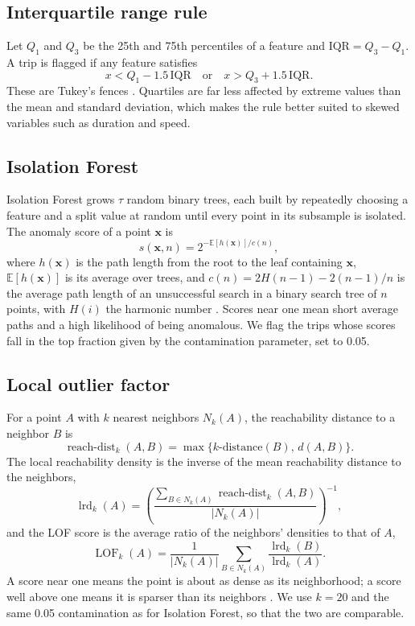 \documentclass{ieeeaccess}
\begin{document}
\subsection{Interquartile range rule}
Let $Q_1$ and $Q_3$ be the 25th and 75th percentiles of a feature and $\mathrm{IQR}=Q_3-Q_1$. A trip is flagged if any feature satisfies
\begin{equation}
x<Q_1-1.5\,\mathrm{IQR}\quad\text{or}\quad x>Q_3+1.5\,\mathrm{IQR}.
\end{equation}
These are Tukey's fences \cite{tukey1977}. Quartiles are far less affected by extreme values than the mean and standard deviation, which makes the rule better suited to skewed variables such as duration and speed.

\subsection{Isolation Forest}
Isolation Forest grows $\tau$ random binary trees, each built by repeatedly choosing a feature and a split value at random until every point in its subsample is isolated. The anomaly score of a point $\mathbf{x}$ is
\begin{equation}
s(\mathbf{x},n)=2^{-\mathbb{E}[h(\mathbf{x})]/c(n)},
\end{equation}
where $h(\mathbf{x})$ is the path length from the root to the leaf containing $\mathbf{x}$, $\mathbb{E}[h(\mathbf{x})]$ is its average over trees, and $c(n)=2H(n-1)-2(n-1)/n$ is the average path length of an unsuccessful search in a binary search tree of $n$ points, with $H(i)$ the harmonic number \cite{liu2008}. Scores near one mean short average paths and a high likelihood of being anomalous. We flag the trips whose scores fall in the top fraction given by the contamination parameter, set to 0.05.

\subsection{Local outlier factor}
For a point $A$ with $k$ nearest neighbors $N_k(A)$, the reachability distance to a neighbor $B$ is
\begin{equation}
\operatorname{reach\text{-}dist}_k(A,B)=\max\{k\text{-distance}(B),\,d(A,B)\}.
\end{equation}
The local reachability density is the inverse of the mean reachability distance to the neighbors,
\begin{equation}
\operatorname{lrd}_k(A)=\left(\frac{\sum_{B\in N_k(A)}\operatorname{reach\text{-}dist}_k(A,B)}{|N_k(A)|}\right)^{-1},
\end{equation}
and the LOF score is the average ratio of the neighbors' densities to that of $A$,
\begin{equation}
\operatorname{LOF}_k(A)=\frac{1}{|N_k(A)|}\sum_{B\in N_k(A)}\frac{\operatorname{lrd}_k(B)}{\operatorname{lrd}_k(A)}.
\end{equation}
A score near one means the point is about as dense as its neighborhood; a score well above one means it is sparser than its neighbors \cite{breunig2000}. We use $k=20$ and the same 0.05 contamination as for Isolation Forest, so that the two are comparable.
\end{document}
